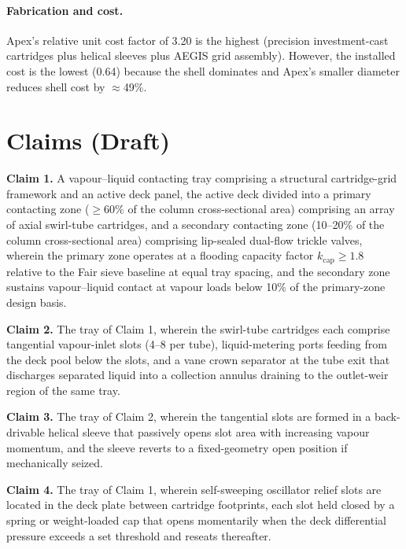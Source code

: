 \documentclass[11pt,letterpaper]{article}
\begin{document}
\paragraph{Fabrication and cost.}
Apex's relative unit cost factor of 3.20 is the highest (precision
investment-cast cartridges plus helical sleeves plus AEGIS grid assembly).
However, the installed cost is the lowest (0.64) because the shell dominates
and Apex's smaller diameter reduces shell cost by $\approx$49\%.

\section{Claims (Draft)}
\label{sec:claims}

\textbf{Claim 1.}
A vapour--liquid contacting tray comprising a structural cartridge-grid
framework and an active deck panel, the active deck divided into a primary
contacting zone ($\geq 60\%$ of the column cross-sectional area) comprising
an array of axial swirl-tube cartridges, and a secondary contacting zone
(10--20\% of the column cross-sectional area) comprising lip-sealed dual-flow
trickle valves, wherein the primary zone operates at a flooding capacity
factor $k_{\mathrm{cap}} \geq 1.8$ relative to the Fair sieve baseline at
equal tray spacing, and the secondary zone sustains vapour--liquid contact
at vapour loads below 10\% of the primary-zone design basis.

\textbf{Claim 2.}
The tray of Claim 1, wherein the swirl-tube cartridges each comprise
tangential vapour-inlet slots (4--8 per tube), liquid-metering ports feeding
from the deck pool below the slots, and a vane crown separator at the tube
exit that discharges separated liquid into a collection annulus draining to
the outlet-weir region of the same tray.

\textbf{Claim 3.}
The tray of Claim 2, wherein the tangential slots are formed in a
back-drivable helical sleeve that passively opens slot area with increasing
vapour momentum, and the sleeve reverts to a fixed-geometry open position if
mechanically seized.

\textbf{Claim 4.}
The tray of Claim 1, wherein self-sweeping oscillator relief slots are
located in the deck plate between cartridge footprints, each slot held closed
by a spring or weight-loaded cap that opens momentarily when the
deck differential pressure exceeds a set threshold and reseats thereafter.
\end{document}
